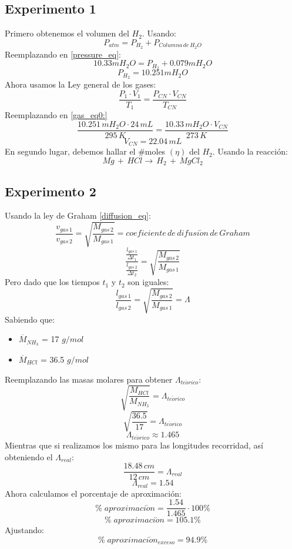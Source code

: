 \documentclass[../main.tex]{subfiles}
\begin{document}
\subsection{Experimento 1}
Primero obtenemos el volumen del $H_2$.
Usando:
\begin{equation} \label{pressure_eq}
    P_{atm} = P_{H_2} + P_{Columna \, de \, H_2O}
\end{equation}
Reemplazando en \ref{pressure_eq}:
\[ 10.33mH_2O = P_{H_2} + 0.079mH_2O \]
\[ P_{H_2} = 10.251mH_2O \]
Ahora usamos la Ley general de los gases:
\begin{equation} \label{gas_eq}
    \frac{P_1 \cdot V_1}{T_1} = \frac{P_{CN} \cdot V_{CN}}{T_{CN}}
\end{equation}
Reemplazando en \ref{gas_eq0:}
\[
    \frac{10.251 \, mH_2O \cdot 24 \, mL}{295 \, K} =
    \frac{10.33 \, mH_2O \cdot V_{CN}}{273 \, K}
\]
\[ V_{CN} = 22.04 \, mL\]
En segundo lugar, debemos hallar el #moles $(\eta)$ del $H_2$.
Usando la reacción:
\[ Mg \, + \, HCl \rightarrow \, H_2 \, + \, MgCl_2 \]

\subsection{Experimento 2}

Usando la ley de Graham \ref{diffusion_eq}:
\begin{equation}
    \frac{v_{gas\, 1}}{v_{gas\, 2}} =
    \sqrt{\frac{M_{gas\, 2}}{M_{gas\, 1}}} =
    coeficiente \, de \, difusi\acute{o}n \, de \, Graham
\end{equation}
\[
    \frac{\frac{l_{gas\, 1}}{\Delta t_1}}{\frac{l_{gas\, 2}}{\Delta t_2}} =
    \sqrt{\frac{M_{gas\, 2}}{M_{gas\, 1}}} 
\]
Pero dado que los tiempos $t_1$ y $t_2$ son iguales:
\[
    \frac{l_{gas\, 1}}{l_{gas\, 2}} =
    \sqrt{\frac{M_{gas\, 2}}{M_{gas\, 1}}} =
    \Lambda
\]
Sabiendo que:
\begin{itemize}
    \item $\overline{M}_{NH_3}$ = 17 $g/mol$
    \item $\overline{M}_{HCl}$  = 36.5 $g/mol$
\end{itemize}
Reemplazando las masas molares para obtener $\Lambda_{te\acute{o}rico}$:
\[
    \sqrt{\frac{M_{HCl}}{M_{NH_3}}} =
    \Lambda_{te\acute{o}rico}
\]
\[
    \sqrt{\frac{36.5}{17}} =
    \Lambda_{te\acute{o}rico}
\]
\[ \Lambda_{te\acute{o}rico} \approx 1.465 \]
Mientras que si realizamos los mismo para las longitudes recorridad, así 
obteniendo el $\Lambda_{real}$:
\[
    \frac{18.48 \, cm}{12 \, cm} =
    \Lambda_{real}
\]
\[ \Lambda_{real} = 1.54\]
Ahora calculamos el porcentaje de aproximación:
\[ \% \; aproximaci\acute{o}n = \frac{1.54}{1.465} \cdot 100\%\]    
\[ \% \; aproximaci\acute{o}n = 105.1\%\]
Ajustando:
\[ \% \; aproximaci\acute{o}n_{exceso} = 94.9\%\]
\end{document}
